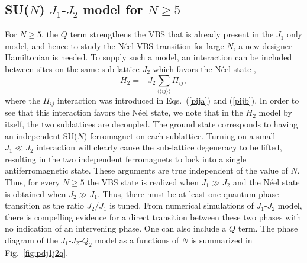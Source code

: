 \documentclass[range]{ar2e}
\begin{document}
\subsection{SU($N$) $J_1$-$J_2$ model for $N\geq 5$}
\label{ss:j1j2N}

For $N\geq 5$, the $Q$ term strengthens the VBS that is already present in the $J_1$ only model, and hence to study the N\'eel-VBS transition 
for large-$N$, a new designer Hamiltonian is needed. To supply such a model, an interaction can be included
between sites on the same sub-lattice $J_2$ which favors the N\'eel state \cite{kaul2011:j1j2},
\begin{equation}
H_{2}= -J_2 \sum_{\langle\langle ij\rangle\rangle} \Pi_{ij},
\end{equation}
where the $\Pi_{ij}$ interaction was introduced in Eqs.~(\ref{pija}) and (\ref{pijb}).
In order to see that this interaction favors the N\'eel state, we note that in the $H_{2}$ model by itself, the two sublattices 
are decoupled. The ground state corresponds to having an independent SU($N$) ferromagnet on each sublattice. Turning on a small $J_1\ll J_2$ 
interaction will clearly cause the sub-lattice degeneracy to be lifted, resulting in the two independent ferromagnets to lock into a single
antiferromagnetic state. These arguments are true independent of the value of $N$. Thus, for every $N\geq 5$ the VBS state is realized when 
$J_1\gg J_2$ and the N\'eel state is obtained when $J_2 \gg J_1$. Thus, there must be at least one quantum phase transition as the ratio
$J_2/J_1$ is tuned. From numerical simulations of $J_1$-$J_2$ model, there is compelling evidence for a direct transition between these two 
phases with no indication of an intervening phase. One can also include a $Q$ term. The phase diagram of the $J_1$-$J_2$-$Q_2$ model as a functions 
of $N$ is summarized in Fig.~\ref{fig:pdj1j2q}.
\end{document}
